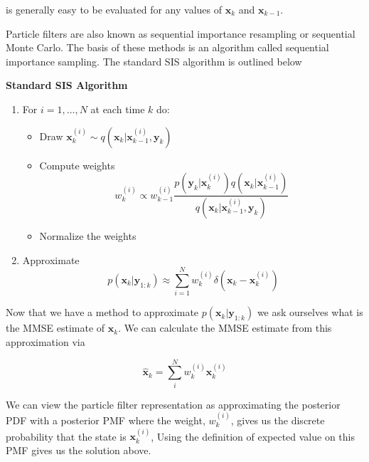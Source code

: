 is generally easy to be evaluated for any values of $ \mathbf{x}_k$ and $\mathbf{x}_{k-1}$.

Particle filters are also known as sequential importance resampling or sequential Monte Carlo.
The basis of these methods is an algorithm called  sequential importance sampling. The standard SIS algorithm
is outlined below 


\begin{framed}
\theoremstyle{remark}
\begin{remark}{\textbf{Standard SIS Algorithm}}

\begin{enumerate}
\item For $i=1,\ldots, N$ at each time $k$ do:
	\begin{itemize}
		\item Draw $\mathbf{x}_{k}^{(i)} \sim q(\mathbf{x}_k | \mathbf{x}_{k-1}^{(i)}, \mathbf{y}_k)$
		\item Compute weights
			\begin{equation}
				w_{k}^{(i)} \propto w_{k-1}^{(i)} \frac{p(\mathbf{y}_k | \mathbf{x}_{k}^{(i)})q(\mathbf{x}_k | \mathbf{x}_{k-1}^{(i)})}{q(\mathbf{x}_k | \mathbf{x}_{k-1}^{(i)}, \mathbf{y}_k)}
			\end{equation}
		\item Normalize the weights
	\end{itemize}
\item Approximate
\begin{equation}
p(\mathbf{x}_k | \mathbf{y}_{1:k}) \approx \sum_{i=1}^{N} w_{k}^{(i)} \delta(\mathbf{x}_k - \mathbf{x}_{k}^{(i)})
\end{equation}
\end{enumerate}

\end{remark}
\end{framed}

Now that we have a method to approximate $p(\mathbf{x}_k | \mathbf{y}_{1:k})$ we ask ourselves what is the MMSE estimate of $\mathbf{x}_k$.
We can  calculate the MMSE estimate from this approximation via

\begin{equation}
\hat{\mathbf{x}}_k = \sum_{i}^{N} w_{k}^{(i)} \mathbf{x}_{k}^{(i)}
\end{equation}

We can view the particle filter representation as approximating the posterior PDF with a posterior PMF where the weight, $w_{k}^{(i)}$, 
gives us the discrete probability that the state is $\mathbf{x}_{k}^{(i)}$, Using the definition of expected value on this PMF gives us the solution above.


